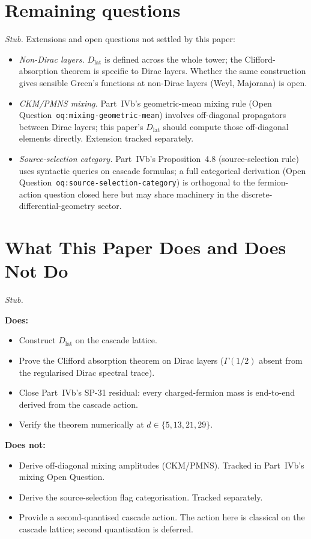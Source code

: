 \documentclass[12pt,a4paper]{article}
\begin{document}
\section{Remaining questions}\label{sec:remaining}
\emph{Stub.} Extensions and open questions not settled by this paper:
\begin{itemize}
\item \emph{Non-Dirac layers.} $D_{\mathrm{lat}}$ is defined across
the whole tower; the Clifford-absorption theorem is specific to
Dirac layers. Whether the same construction gives sensible Green's
functions at non-Dirac layers (Weyl, Majorana) is open.
\item \emph{CKM/PMNS mixing.} Part~IVb's geometric-mean mixing rule
(Open Question~\texttt{oq:mixing-geometric-mean}) involves
off-diagonal propagators between Dirac layers; this paper's
$D_{\mathrm{lat}}$ should compute those off-diagonal elements
directly. Extension tracked separately.
\item \emph{Source-selection category.} Part~IVb's Proposition~4.8
(source-selection rule) uses syntactic queries on cascade formulas;
a full categorical derivation
(Open Question~\texttt{oq:source-selection-category}) is
orthogonal to the fermion-action question closed here but may share
machinery in the discrete-differential-geometry sector.
\end{itemize}

\section{What This Paper Does and Does Not Do}
\emph{Stub.}

\textbf{Does:}
\begin{itemize}
\item Construct $D_{\mathrm{lat}}$ on the cascade lattice.
\item Prove the Clifford absorption theorem on Dirac layers
($\Gamma(1/2)$ absent from the regularised Dirac spectral trace).
\item Close Part~IVb's SP-31 residual: every charged-fermion mass
is end-to-end derived from the cascade action.
\item Verify the theorem numerically at
$d\in\{5,13,21,29\}$.
\end{itemize}

\textbf{Does not:}
\begin{itemize}
\item Derive off-diagonal mixing amplitudes (CKM/PMNS). Tracked in
Part~IVb's mixing Open Question.
\item Derive the source-selection flag categorisation. Tracked
separately.
\item Provide a second-quantised cascade action. The action here is
classical on the cascade lattice; second quantisation is deferred.
\end{itemize}
\end{document}
